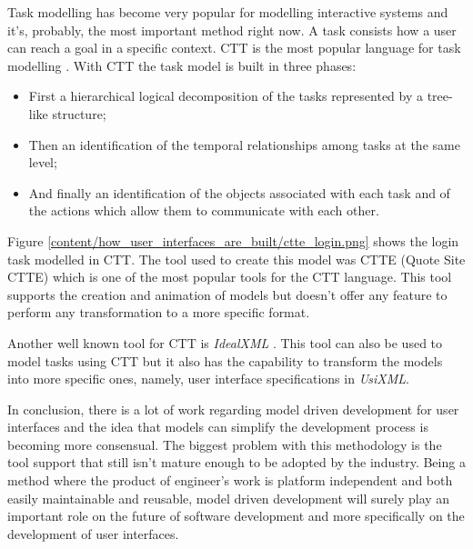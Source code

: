Task modelling has become very popular for modelling interactive systems and it's, probably, the most important method right now. A task consists how a user can reach a goal in a specific context. CTT is the most popular language for task modelling \cite{ConcurTaskTrees_A_Diagrammatic_Notation_for_Specifying_Task_Models}. With CTT the task model is built in three phases:
\begin{itemize}
\item First a hierarchical logical decomposition of the tasks represented by a tree-like structure;
\item Then an identification of the temporal relationships among tasks at the same level;
\item And finally an identification of the objects associated with each task and of the actions which allow them to communicate with each other.
\end{itemize} 

Figure \ref{content/how_user_interfaces_are_built/ctte_login.png} shows the login task modelled in CTT. The tool used to create this model was CTTE (Quote Site CTTE) which is one of the most popular tools for the CTT language. This tool supports the creation and animation of models but doesn’t offer any feature to perform any transformation to a more specific format.

Another well known tool for CTT is \textit{IdealXML} \cite{IdealXml_An_Interaction_Design_Tool}. This tool can also be used to model tasks using CTT but it also has the capability to transform the models into more specific ones, namely, user interface specifications in \textit{UsiXML}.

In conclusion, there is a lot of work regarding model driven development for user interfaces and the idea that models can simplify the development process is becoming more consensual. The biggest problem with this methodology is the tool support that still isn't mature enough to be adopted by the industry. Being a method where the product of engineer's work is platform independent and both easily maintainable and reusable, model driven development will surely play an important role on the future of software development and more specifically on the development of user interfaces.
